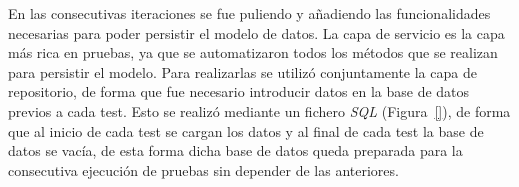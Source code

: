 En las consecutivas iteraciones se fue puliendo y añadiendo las funcionalidades necesarias para poder persistir el modelo de datos.
La capa de servicio es la capa más rica en pruebas, ya que se automatizaron todos los métodos que se realizan para persistir el modelo. Para realizarlas se utilizó conjuntamente la capa de repositorio, de forma que fue necesario introducir datos en la base de datos previos a cada test. Esto se realizó mediante un fichero \emph{SQL} (Figura~\ref{}), de forma que al inicio de cada test se cargan los datos y al final de cada test la base de datos se vacía, de esta forma dicha base de datos queda preparada para la consecutiva ejecución de pruebas sin depender de las anteriores.


